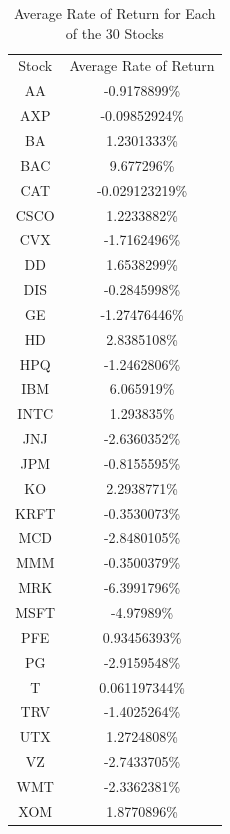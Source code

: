 \documentclass[a4paper,twoside]{article}
\begin{document}
\begin{table}
    \caption{{Average Rate of Return for Each of the 30 Stocks}} 
    \label{avg-rates-of-return-table}
    \begin{tabular}{ c c }
        Stock & Average Rate of Return \\ 
        AA & -0.9178899\% \\ %
        AXP & -0.09852924\% \\ %
        BA & 1.2301333\% \\ %
        BAC & 9.677296\% \\ %
        CAT & -0.029123219\% \\ %
        CSCO & 1.2233882\% \\ %
        CVX & -1.7162496\% \\ %
        DD & 1.6538299\% \\ %
        DIS & -0.2845998\% \\ %
        GE & -1.27476446\% \\ %
        HD & 2.8385108\% \\ %
        HPQ & -1.2462806\% \\ %
        IBM & 6.065919\% \\ %
        INTC & 1.293835\% \\ %
        JNJ & -2.6360352\% \\ %
        JPM & -0.8155595\% \\ %
        KO & 2.2938771\% \\ %
        KRFT & -0.3530073\% \\ %
        MCD & -2.8480105\% \\ %
        MMM & -0.3500379\% \\ %
        MRK & -6.3991796\% \\ %
        MSFT & -4.97989\% \\ %
        PFE & 0.93456393\% \\ %
        PG & -2.9159548\% \\ %
        T & 0.061197344\% \\ %
        TRV & -1.4025264\% \\ %
        UTX & 1.2724808\% \\ %
        VZ & -2.7433705\% \\ %
        WMT & -2.3362381\% \\ %
        XOM & 1.8770896\% \\ %
    \end{tabular}
\end{table}
  
\end{document}
